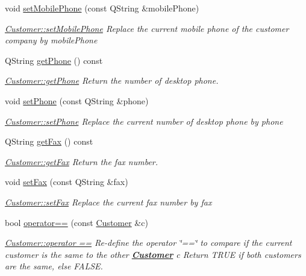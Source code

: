 \begin{DoxyCompactItemize}
void \hyperlink{classCustomer_aec562d504cd6c6e3db153544b102e028}{set\+Mobile\+Phone} (const Q\+String \&mobile\+Phone)
\begin{DoxyCompactList}\small\item\em \hyperlink{classCustomer_aec562d504cd6c6e3db153544b102e028}{Customer\+::set\+Mobile\+Phone} Replace the current mobile phone of the customer company by {\itshape mobile\+Phone} \end{DoxyCompactList}\item 
Q\+String \hyperlink{classCustomer_a20b37c158f138def2014f24f291f2aa0}{get\+Phone} () const 
\begin{DoxyCompactList}\small\item\em \hyperlink{classCustomer_a20b37c158f138def2014f24f291f2aa0}{Customer\+::get\+Phone} Return the number of desktop phone. \end{DoxyCompactList}\item 
void \hyperlink{classCustomer_a850d6e8e1a061362928de94553cb12a6}{set\+Phone} (const Q\+String \&phone)
\begin{DoxyCompactList}\small\item\em \hyperlink{classCustomer_a850d6e8e1a061362928de94553cb12a6}{Customer\+::set\+Phone} Replace the current number of desktop phone by {\itshape phone} \end{DoxyCompactList}\item 
Q\+String \hyperlink{classCustomer_ab982339f461136ce230740d776a98ae9}{get\+Fax} () const 
\begin{DoxyCompactList}\small\item\em \hyperlink{classCustomer_ab982339f461136ce230740d776a98ae9}{Customer\+::get\+Fax} Return the fax number. \end{DoxyCompactList}\item 
void \hyperlink{classCustomer_a29049b62abb6aa0733c5def198ed62e5}{set\+Fax} (const Q\+String \&fax)
\begin{DoxyCompactList}\small\item\em \hyperlink{classCustomer_a29049b62abb6aa0733c5def198ed62e5}{Customer\+::set\+Fax} Replace the current fax number by {\itshape fax} \end{DoxyCompactList}\item 
bool \hyperlink{classCustomer_ae55c14b91c08ba15c9593a47931d1949}{operator==} (const \hyperlink{classCustomer}{Customer} \&c)
\begin{DoxyCompactList}\small\item\em \hyperlink{classCustomer_ae55c14b91c08ba15c9593a47931d1949}{Customer\+::operator ==} Re-\/define the operator \char`\"{}==\char`\"{} to compare if the current customer is the same to the other {\bfseries \hyperlink{classCustomer}{Customer}} {\itshape c} Return T\+R\+U\+E if both customers are the same, else F\+A\+L\+S\+E. \end{DoxyCompactList}\item 

\end{DoxyCompactItemize}
